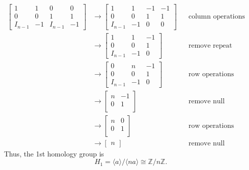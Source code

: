 \documentclass[12pt]{article}
\theoremstyle{definition}
\newcommand{\Z}{\mathbb{Z}}
\newcommand{\<}{\langle}
\renewcommand{\>}{\rangle}
\newcommand{\iso}{\cong}
\newcommand{\mat}[1]{\begin{bmatrix}#1\end{bmatrix}}
\begin{document}
\begin{align*}
    \mat{
        1 & 1 & 0 & 0 \\
        0 & 0 & 1 & 1 \\
        I_{n-1} & -1 & I_{n-1} & -1
    }
        &\to
        \mat{
            1 & 1 & -1 & -1 \\
            0 & 0 & 1 & 1 \\
            I_{n-1} & -1 & 0 & 0
        } && \text{column operations} \\
        &\to
        \mat{
            1 & 1 & -1 \\
            0 & 0 & 1 \\
            I_{n-1} & -1 & 0 
        } && \text{remove repeat columns} \\
        &\to
        \mat{
            0 & n & -1 \\
            0 & 0 & 1 \\
            I_{n-1} & -1 & 0 
        } && \text{row operations} \\
        &\to
        \mat{
            n & -1 \\
            0 & 1 \\
        } && \text{remove null generators} \\
        &\to \mat{
            n & 0 \\
            0 & 1 \\
        } && \text{row operations} \\
        &\to \mat{n} && \text{remove null generators}
\end{align*}
Thus, the 1st homology group is
\[
    H_1 = \<a\> / \<na\> \iso \Z/n\Z.
\]
\end{document}
